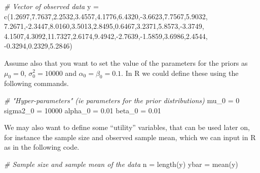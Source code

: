 \documentclass[
]{article}
\newenvironment{Shaded}{\begin{snugshade}}{\end{snugshade}}
\newcommand{\CommentTok}[1]{\textcolor[rgb]{0.56,0.35,0.01}{\textit{#1}}}
\newcommand{\DecValTok}[1]{\textcolor[rgb]{0.00,0.00,0.81}{#1}}
\newcommand{\FloatTok}[1]{\textcolor[rgb]{0.00,0.00,0.81}{#1}}
\newcommand{\FunctionTok}[1]{\textcolor[rgb]{0.00,0.00,0.00}{#1}}
\newcommand{\NormalTok}[1]{#1}
\newcommand{\OtherTok}[1]{\textcolor[rgb]{0.56,0.35,0.01}{#1}}
\newcommand{\SpecialCharTok}[1]{\textcolor[rgb]{0.00,0.00,0.00}{#1}}
\begin{document}
\begin{Shaded}
\begin{Highlighting}[]
\CommentTok{\# Vector of observed data}
\NormalTok{y }\OtherTok{=} \FunctionTok{c}\NormalTok{(}\FloatTok{1.2697}\NormalTok{,}\FloatTok{7.7637}\NormalTok{,}\FloatTok{2.2532}\NormalTok{,}\FloatTok{3.4557}\NormalTok{,}\FloatTok{4.1776}\NormalTok{,}\FloatTok{6.4320}\NormalTok{,}\SpecialCharTok{{-}}\FloatTok{3.6623}\NormalTok{,}\FloatTok{7.7567}\NormalTok{,}\FloatTok{5.9032}\NormalTok{,}
\FloatTok{7.2671}\NormalTok{,}\SpecialCharTok{{-}}\FloatTok{2.3447}\NormalTok{,}\FloatTok{8.0160}\NormalTok{,}\FloatTok{3.5013}\NormalTok{,}\FloatTok{2.8495}\NormalTok{,}\FloatTok{0.6467}\NormalTok{,}\FloatTok{3.2371}\NormalTok{,}\FloatTok{5.8573}\NormalTok{,}\SpecialCharTok{{-}}\FloatTok{3.3749}\NormalTok{,}
\FloatTok{4.1507}\NormalTok{,}\FloatTok{4.3092}\NormalTok{,}\FloatTok{11.7327}\NormalTok{,}\FloatTok{2.6174}\NormalTok{,}\FloatTok{9.4942}\NormalTok{,}\SpecialCharTok{{-}}\FloatTok{2.7639}\NormalTok{,}\SpecialCharTok{{-}}\FloatTok{1.5859}\NormalTok{,}\FloatTok{3.6986}\NormalTok{,}\FloatTok{2.4544}\NormalTok{,}
\SpecialCharTok{{-}}\FloatTok{0.3294}\NormalTok{,}\FloatTok{0.2329}\NormalTok{,}\FloatTok{5.2846}\NormalTok{)}
\end{Highlighting}
\end{Shaded}

Assume also that you want to set the value of the parameters for the
priors as \(\mu_0 = 0\), \(\sigma_0^2 = 10000\) and
\(\alpha_0 = \beta_0 = 0.1\). In R we could define these using the
following commands.

\begin{Shaded}
\begin{Highlighting}[]
\CommentTok{\# "Hyper{-}parameters" (ie parameters for the prior distributions)}
\NormalTok{mu\_0 }\OtherTok{=} \DecValTok{0}
\NormalTok{sigma2\_0 }\OtherTok{=} \DecValTok{10000}
\NormalTok{alpha\_0 }\OtherTok{=} \FloatTok{0.01}
\NormalTok{beta\_0 }\OtherTok{=} \FloatTok{0.01}
\end{Highlighting}
\end{Shaded}

We may also want to define some ``utility'' variables, that can be used
later on, for instance the sample size and observed sample mean, which
we can input in R as in the following code.

\begin{Shaded}
\begin{Highlighting}[]
\CommentTok{\# Sample size and sample mean of the data}
\NormalTok{n }\OtherTok{=} \FunctionTok{length}\NormalTok{(y)}
\NormalTok{ybar }\OtherTok{=} \FunctionTok{mean}\NormalTok{(y)}
\end{Highlighting}
\end{Shaded}
\end{document}
